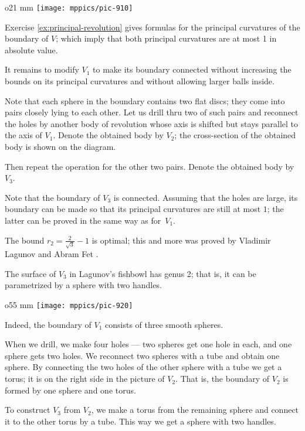 \begin{wrapfigure}{o}{21 mm}
\vskip-0mm
\centering
\texttt{[image: mppics/pic-910]}
\vskip0mm
\end{wrapfigure}

Exercise \ref{ex:principal-revolution} gives formulas for the principal curvatures of the boundary of $V$;
which imply that both principal curvatures are at most 1 in absolute value. 

It remains to modify $V_1$ to make its boundary connected without increasing the bounds on its principal curvatures and without allowing larger balls inside.

Note that each sphere in the boundary contains two flat discs;
they come into pairs closely lying to each other. 
Let us drill thru two of such pairs and reconnect the holes by another body of revolution whose 
axis is shifted but stays parallel to the axis of $V_1$.
Denote the obtained body by $V_2$; the cross-section of the obtained body is shown on the diagram. 

Then repeat the operation for the other two pairs.
Denote the obtained body by $V_3$.

Note that the boundary of $V_3$ is connected.
Assuming that the holes are large, its boundary can be made so that its principal curvatures are still at most $1$; the latter can be proved in the same way as for~$V_1$.
\qeds


The bound $r_2=\tfrac2{\sqrt{3}}-1$ is optimal;
this and more was proved by Vladimir Lagunov and Abram Fet \cite{lagunov-1960, lagunov-fet-1963, lagunov-fet-1965}.

The surface of $V_3$ in Lagunov's fishbowl has genus 2;
that is, it can be parametrized by a sphere with two handles.

\begin{wrapfigure}{o}{55 mm}
\centering
\vskip-0mm
\texttt{[image: mppics/pic-920]}
\vskip0mm
\end{wrapfigure}

Indeed, the boundary of $V_1$ consists of three smooth spheres.

When we drill, we make four holes --- two spheres get one hole in each, and one sphere gets two holes.
We reconnect two spheres with a tube and obtain one sphere.
By connecting the two holes of the other sphere with a tube we get a torus;
it is on the right side in the picture of $V_2$.
That is, the boundary of $V_2$ is formed by one sphere and one torus.

To construct $V_3$ from $V_2$, we make a torus from the remaining sphere and connect it to the other torus by a tube.
This way we get a sphere with two handles.

